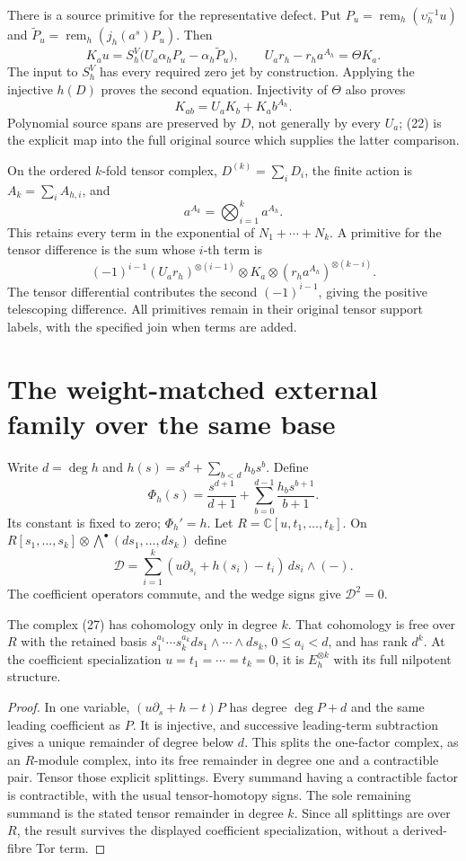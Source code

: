 There is a source primitive for the representative defect. Put $P_u=\operatorname{rem}_h(\upsilon_h^{-1}u)$ and $\widetilde P_u=\operatorname{rem}_h(j_h(a^s)P_u)$. Then
\[
 K_a u=S_h^V\bigl(U_a\alpha_hP_u-\alpha_h\widetilde P_u\bigr),
 \qquad U_ar_h-r_ha^{A_h}=\Theta K_a.
 \tag{22}
\]
The input to $S_h^V$ has every required zero jet by construction. Applying the injective $h(D)$ proves the second equation. Injectivity of $\Theta$ also proves
\[
 K_{ab}=U_aK_b+K_a b^{A_h}.
 \tag{23}
\]
Polynomial source spans are preserved by $D$, not generally by every $U_a$; (22) is the explicit map into the full original source which supplies the latter comparison.

On the ordered $k$-fold tensor complex, $D^{(k)}=\sum_iD_i$, the finite action is $A_k=\sum_iA_{h,i}$, and
\[
 a^{A_k}=\bigotimes_{i=1}^k a^{A_h}.
 \tag{24}
\]
This retains every term in the exponential of $N_1+\cdots+N_k$. A primitive for the tensor difference is the sum whose $i$-th term is
\[
 (-1)^{i-1}(U_ar_h)^{\otimes(i-1)}\otimes K_a
          \otimes(r_ha^{A_h})^{\otimes(k-i)}.
 \tag{25}
\]
The tensor differential contributes the second $(-1)^{i-1}$, giving the positive telescoping difference. All primitives remain in their original tensor support labels, with the specified join when terms are added.

\section{The weight-matched external family over the same base}
Write $d=\deg h$ and $h(s)=s^d+\sum_{b<d}h_bs^b$. Define
\[
 \Phi_h(s)=\frac{s^{d+1}}{d+1}+
           \sum_{b=0}^{d-1}\frac{h_bs^{b+1}}{b+1}.
 \tag{26}
\]
Its constant is fixed to zero; $\Phi_h'=h$. Let $R=\mathbb C[u,t_1,\ldots,t_k]$. On $R[s_1,\ldots,s_k]\otimes\bigwedge^\bullet(ds_1,\ldots,ds_k)$ define
\[
 \mathcal D=\sum_{i=1}^k
       (u\partial_{s_i}+h(s_i)-t_i)\,ds_i\wedge(-).
 \tag{27}
\]
The coefficient operators commute, and the wedge signs give $\mathcal D^2=0$.

\begin{theorem}
The complex (27) has cohomology only in degree $k$. That cohomology is free over $R$ with the retained basis $s_1^{a_1}\cdots s_k^{a_k}ds_1\wedge\cdots\wedge ds_k$, $0\le a_i<d$, and has rank $d^k$. At the coefficient specialization $u=t_1=\cdots=t_k=0$, it is $E_h^{\otimes k}$ with its full nilpotent structure.
\end{theorem}
\begin{proof}
In one variable, $(u\partial_s+h-t)P$ has degree $\deg P+d$ and the same leading coefficient as $P$. It is injective, and successive leading-term subtraction gives a unique remainder of degree below $d$. This splits the one-factor complex, as an $R$-module complex, into its free remainder in degree one and a contractible pair. Tensor those explicit splittings. Every summand having a contractible factor is contractible, with the usual tensor-homotopy signs. The sole remaining summand is the stated tensor remainder in degree $k$. Since all splittings are over $R$, the result survives the displayed coefficient specialization, without a derived-fibre Tor term.
\end{proof}

